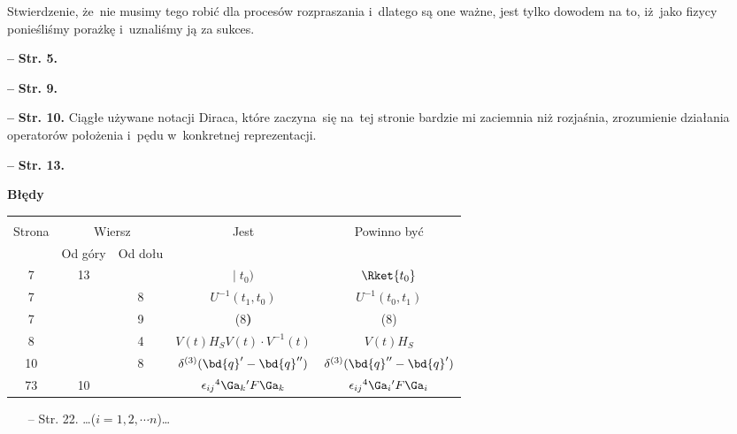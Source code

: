 \documentclass[a4paper,11pt]{article}
\newcommand{\spaceOne}{2em}
\newcommand{\del}{\delta}
\newcommand{\eps}{\epsilon}
\newcommand{\tb}{\textbf}
\newcommand{\noi}{\noindent}
\newcommand{\start}{\noi \tb{--} {}}
\newcommand{\Str}[1]{\tb{Str. #1.}}
\newcommand{\Center}[1]{\begin{center} #1 \end{center}}
\newcommand{\CenterTB}[1]{\Center{\tb{#1}}}
\begin{document}
Stwierdzenie, że~nie musimy tego robić dla procesów rozpraszania
i~dlatego są one ważne, jest tylko dowodem na to, iż~jako fizycy
ponieśliśmy porażkę i~uznaliśmy ją za sukces.

\start \Str{5}

\start \Str{9}

\start \Str{10} Ciągłe używane notacji Diraca, które zaczyna~się
na~tej stronie bardzie mi zaciemnia niż rozjaśnia, zrozumienie
działania operatorów położenia i~pędu w~konkretnej reprezentacji.

\start \Str{13}


\CenterTB{Błędy}
\begin{center}
  \begin{tabular}{|c|c|c|c|c|}
    \hline
    & \multicolumn{2}{c|}{} & & \\
    Strona & \multicolumn{2}{c|}{Wiersz} & Jest
                              & Powinno być \\ \cline{2-3}
    & Od góry & Od dołu & & \\
    \hline
    7 & 13 & & $| \; t_{ 0 } )$ & $\Rket{ t_{ 0 } }$ \\
    7 & & 8 & $U^{ -1 }( t_{ 1 }, t_{ 0 } )$ & $U^{ -1 }( t_{ 0 }, t_{ 1 } )$ \\
    7 & & 9 & (8\tb{)} & (8) \\
    8 & & 4 & $V( t ) H_{ S } V( t ) \cdot V^{ -1 }( t )$
           & $V( t ) H_{ S }$ \\
    10 & & 8 & $\del^{ ( 3 ) }( \bd{ q }' - \bd{ q }'' )$
           & $\del^{ ( 3 ) }( \bd{ q }'' - \bd{ q }' )$ \\
    73 & 10 & & $\eps_{ i j }{}^{ 4 } \Ga_{ k }{}' F \Ga_{ k }$
           & $\eps_{ i j }{}^{ 4 } \Ga_{ i }{}' F \Ga_{ i }$ \\
    \hline
  \end{tabular}
\end{center}
%
\begin{itemize}
\item[--] Str. 22. \ldots ($i = 1, 2,\cdots n$)\ldots
\end{itemize}

\vspace{\spaceOne}





 {}
\end{document}
